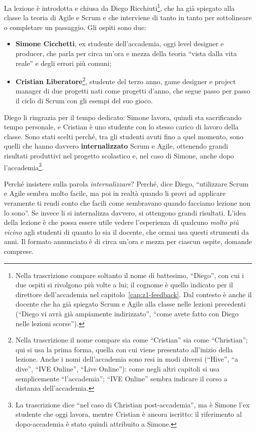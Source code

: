 La lezione è introdotta e chiusa da Diego Ricchiuti\footnote{Nella
trascrizione compare soltanto il nome di battesimo, ``Diego'', con cui i due
ospiti si rivolgono più volte a lui; il cognome è quello indicato per il
direttore dell'accademia nel capitolo~\ref{cap:z1-feedback}. Dal contesto è
anche il docente che ha già spiegato Scrum e Agile alla classe nelle lezioni
precedenti (``Diego vi avrà già ampiamente indirizzato'', ``come avete fatto
con Diego nelle lezioni scorse'').}, che ha già spiegato alla classe la teoria
di Agile e Scrum e che interviene di tanto in tanto per sottolineare o
completare un passaggio. Gli ospiti sono due:
\begin{itemize}
  \item \textbf{Simone Cicchetti}, ex studente dell'accademia, oggi level
        designer e producer, che parla per circa un'ora e mezza della teoria
        ``vista dalla vita reale'' e degli errori più comuni;
  \item \textbf{Cristian Liberatore}\footnote{Nella trascrizione il nome
        compare sia come ``Cristian'' sia come ``Christian''; qui si usa la
        prima forma, quella con cui viene presentato all'inizio della
        lezione. Anche i nomi dell'accademia sono resi in modi diversi
        (``Hive'', ``a dive'', ``IVE Online'', ``Live Online''): come negli
        altri capitoli si usa semplicemente ``l'accademia''; ``IVE Online''
        sembra indicare il corso a distanza dell'accademia.}, studente del
        terzo anno, game designer e project manager di due progetti nati
        come progetti d'anno, che segue passo per passo il ciclo di Scrum
        con gli esempi del suo gioco.
\end{itemize}
Diego li ringrazia per il tempo dedicato: Simone lavora, quindi sta
sacrificando tempo personale, e Cristian è uno studente con lo stesso carico
di lavoro della classe. Sono stati scelti perché, tra gli studenti avuti
fino a quel momento, sono quelli che hanno davvero \textbf{internalizzato}
Scrum e Agile, ottenendo grandi risultati produttivi nel progetto scolastico
e, nel caso di Simone, anche dopo l'accademia\footnote{La trascrizione dice
``nel caso di Christian post-accademia'', ma è Simone l'ex studente che oggi
lavora, mentre Cristian è ancora iscritto: il riferimento al dopo-accademia
è stato quindi attribuito a Simone.}.

Perché insistere sulla parola \emph{internalizzare}? Perché, dice Diego,
``utilizzare Scrum e Agile sembra molto facile, ma poi in realtà quando li
provi ad applicare veramente ti rendi conto che facili come sembravano quando
facciamo lezione non lo sono''. Se invece li si internalizza davvero, si
ottengono grandi risultati. L'idea della lezione è che possa essere utile
vedere l'esperienza di qualcuno \emph{molto più vicino} agli studenti di
quanto lo sia il docente, che ormai usa questi strumenti da anni. Il formato
annunciato è di circa un'ora e mezza per ciascun ospite, domande comprese.

